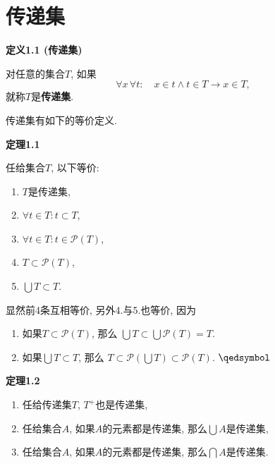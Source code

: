 


\setlength{\abovedisplayskip}{1pt}
\setlength{\belowdisplayskip}{1pt}

\section{传递集}

\hypertarget{sec:定义1.1}{}
\noindent\textbf{定义1.1 (传递集)}

对任意的集合$T$, 如果
\[
    \forall x\,\forall t:\quad x\in t\land t\in T\to x\in T,
\]
就称$T$是\textbf{传递集}.

\vspace{10pt}

传递集有如下的等价定义.

\vspace{10pt}

\hypertarget{sec:定理1.1}{}
\noindent\textbf{定理1.1}

任给集合$T$, 以下等价:
\begin{enumerate}
    \item $T$是传递集,
    \item $\forall t\in T:t\subset T$,
    \item $\forall t\in T:t\in\mathcal{P}(T)$,
    \item $T\subset\mathcal{P}(T)$,
    \item $\displaystyle\bigcup T\subset T$.
\end{enumerate}


显然前4条互相等价, 另外4.与5.也等价, 因为
\vspace{3pt}
\begin{enumerate}
    \item 如果$T\subset\mathcal{P}(T)$, 那么
    $\displaystyle\bigcup T\subset\bigcup\mathcal{P}(T)=T$.
    \vspace{3pt}
    \item 如果$\displaystyle\bigcup T\subset T$, 那么
    $\displaystyle T\subset\mathcal{P}\left(\bigcup T\right)
    \subset\mathcal{P}(T)$. \hfill $\qedsymbol$
\end{enumerate}

\vspace{10pt}

\hypertarget{sec:定理1.2}{}
\noindent\textbf{定理1.2}

\begin{enumerate}
    \item 任给传递集$T$, $T^+$也是传递集,
    \item 任给集合$A$, 如果$A$的元素都是传递集, 那么$\displaystyle\bigcup A$是传递集,
    \item 任给集合$A$, 如果$A$的元素都是传递集, 那么$\displaystyle\bigcap A$是传递集.
\end{enumerate}

